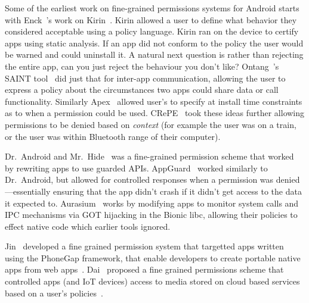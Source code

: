 \documentclass[thesis.tex]{subfiles}
\begin{document}
Some of the earliest work on fine-grained permissions systems for
Android starts with Enck~\etal's work on
Kirin~\cite{enck_lightweight_2009}.  Kirin allowed a user to define
what behavior they considered acceptable using a policy language.
Kirin ran on the device to certify apps using static analysis.  If an
app did not conform to the policy the user would be warned and could
uninstall it.  A natural next question is rather than rejecting the
entire app, can you just reject the behaviour you don't like?
Ontang~\etal's SAINT tool~\cite{ongtang_semantically_2012} did just
that for inter-app communication, allowing the user to express a
policy about the circumstances two apps could share data or call
functionality.  Similarly Apex~\cite{nauman_apex:_2010} allowed user's
to specify at install time constraints as to when a permission could
be used.  
CRePE~\cite{conti_crepe:_2010} took
these ideas further allowing permissions to be denied based on
\emph{context} (for example the user was on a train, or the user was
within Bluetooth range of their computer).

Dr{.}~Android and Mr{.}~Hide~\cite{jeon_dr._2012} was a fine-grained permission
scheme that worked by rewriting apps to use guarded APIs.
AppGuard~\cite{backes_appguard_2013} worked similarly to Dr{.}~Android, but
allowed for controlled responses when a permission was denied---essentially
ensuring that the app didn't crash if it didn't get access to the data it
expected to. Aurasium~\cite{xu_aurasium:_2012} works by modifying apps to
monitor system calls and IPC mechanisms via GOT hijacking in the Bionic libc,
allowing their policies to effect native code which earlier tools ignored.

Jin~\etal{} developed a fine grained permission system that targetted apps
written using the PhoneGap framework, that enable developers to create portable
native apps from web apps~\cite{jin_fine-grained_2015}. Dai~\etal{} proposed a
fine grained permissions scheme that controlled apps (and IoT devices) access to
media stored on cloud based services based on a user's
policies~\cite{dai_who_2017}.
\end{document}
